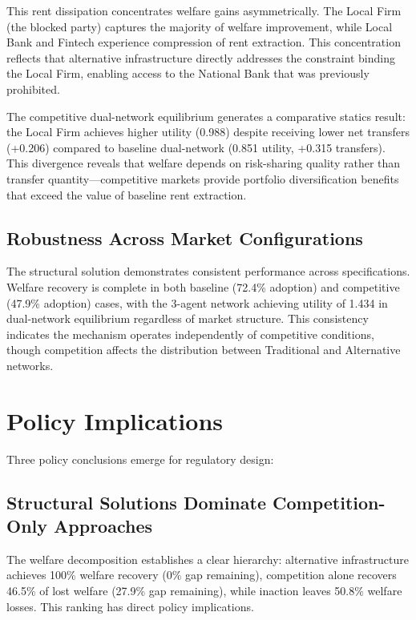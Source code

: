 This rent dissipation concentrates welfare gains asymmetrically. The Local Firm (the blocked party) captures the majority of welfare improvement, while Local Bank and Fintech experience compression of rent extraction. This concentration reflects that alternative infrastructure directly addresses the constraint binding the Local Firm, enabling access to the National Bank that was previously prohibited.

The competitive dual-network equilibrium generates a comparative statics result: the Local Firm achieves higher utility (0.988) despite receiving lower net transfers (+0.206) compared to baseline dual-network (0.851 utility, +0.315 transfers). This divergence reveals that welfare depends on risk-sharing quality rather than transfer quantity—competitive markets provide portfolio diversification benefits that exceed the value of baseline rent extraction.

\subsection{Robustness Across Market Configurations}

The structural solution demonstrates consistent performance across specifications. Welfare recovery is complete in both baseline (72.4\% adoption) and competitive (47.9\% adoption) cases, with the 3-agent network achieving utility of 1.434 in dual-network equilibrium regardless of market structure. This consistency indicates the mechanism operates independently of competitive conditions, though competition affects the distribution between Traditional and Alternative networks.

\section{Policy Implications}

Three policy conclusions emerge for regulatory design:

\subsection{Structural Solutions Dominate Competition-Only Approaches}

The welfare decomposition establishes a clear hierarchy: alternative infrastructure achieves 100\% welfare recovery (0\% gap remaining), competition alone recovers 46.5\% of lost welfare (27.9\% gap remaining), while inaction leaves 50.8\% welfare losses. This ranking has direct policy implications.

